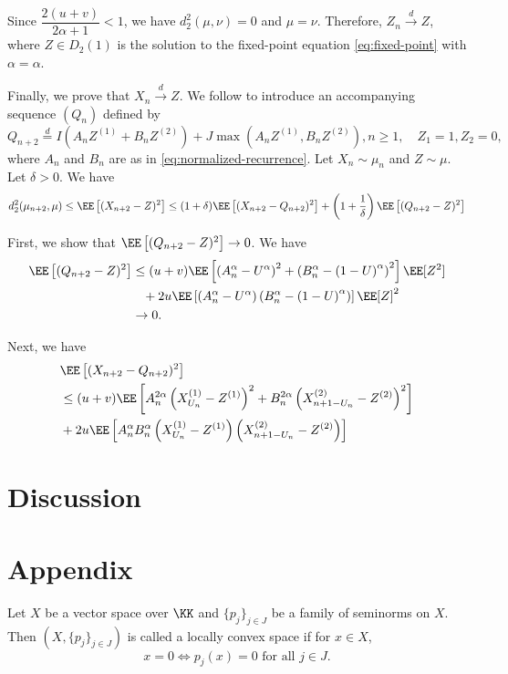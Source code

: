 Since $\dfrac{2(u+v)}{2\alpha+1} < 1$, we have $d_2^2(\mu, \nu) = 0$ and $\mu = \nu$. Therefore, $Z_n\xrightarrow{d} Z$, where $Z \in D_2(1)$ is the solution to the fixed-point equation \eqref{eq:fixed-point} with $\alpha = \alpha$.

Finally, we prove that $X_n\xrightarrow{d} Z$. We follow \cite{neininger2004general} to introduce an accompanying sequence $(Q_n)$ defined by
\begin{equation}
  \label{eq:accompanying-sequence}
  Q_{n+2}
  \stackrel{d}{=} I\left(A_n Z^{(1)} + B_n Z^{(2)}\right) +  J\max\left(A_n Z^{(1)}, B_n Z^{(2)}\right), n\ge 1, \quad Z_1=1, Z_2=0,
\end{equation}
where $A_n$ and $B_n$ are as in \eqref{eq:normalized-recurrence}. Let $X_n\sim \mu_n$ and $Z\sim \mu$. Let $\delta>0$. We have
$$d_2^2(\mu_{n+2}, \mu) \le \EE\left[(X_{n+2}-Z)^2\right] \le (1+\delta)\EE\left[(X_{n+2}-Q_{n+2})^2\right] + \left(1+\dfrac{1}{\delta}\right)\EE\left[(Q_{n+2}-Z)^2\right]$$

First, we show that $\EE\left[(Q_{n+2}-Z)^2\right] \to 0$. We have
\begin{align*}
  \EE\left[(Q_{n+2}-Z)^2\right]
   & \le (u+v)\EE\left[\left(A_n^{\alpha} - U^{\alpha}\right)^2 + \left(B_n^{\alpha} - \left(1-U\right)^{\alpha}\right)^2\right]\EE[Z^2] \\
   & \,\,\,\,\, + 2u\EE\left[\left(A_n^{\alpha} - U^{\alpha}\right)\left(B_n^{\alpha} - \left(1-U\right)^{\alpha}\right)\right]\EE[Z]^2  \\
   & \to 0.
\end{align*}

Next, we have
\begin{align*}
   & \EE\left[(X_{n+2}-Q_{n+2})^2\right]                                                                                                  \\
   & \le  (u+v)\EE\left[A_n^{2\alpha}\left(X_{U_n}^{(1)}-Z^{(1)}\right)^2 + B_n^{2\alpha}\left(X_{n+1-U_n}^{(2)}-Z^{(2)}\right)^2 \right] \\
   & + 2u\EE\left[A_n^{\alpha}B_n^{\alpha}\left(X_{U_n}^{(1)}-Z^{(1)}\right)\left(X_{n+1-U_n}^{(2)}-Z^{(2)}\right)\right]                 \\
\end{align*}


\section{Discussion}

\section{Appendix}
\begin{definition}
  \label{def:locally-convex-space}
  Let $X$ be a vector space over $\KK$ and $\{p_j\}_{j\in J}$ be a family of seminorms on $X$. Then $\left(X, \{p_j\}_{j\in J}\right)$ is called a locally convex space if for $x\in X$,
  $$x = 0 \iff p_j(x)=0 \text{ for all } j\in J.$$
\end{definition}

